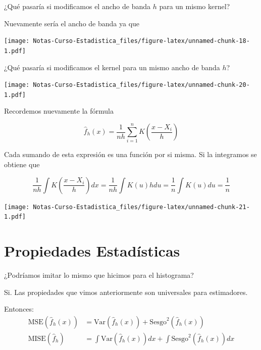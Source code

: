\documentclass[
  12pt,
]{book}
\theoremstyle{definition}
\theoremstyle{definition}
\theoremstyle{definition}
\theoremstyle{remark}
\let\BeginKnitrBlock\begin \let\EndKnitrBlock\end
\begin{document}
\BeginKnitrBlock{remark}
{}¿Qué pasaría si modificamos el ancho de banda \(h\) para un mismo kernel?
\EndKnitrBlock{remark}

Nuevamente sería el ancho de banda ya que

\texttt{[image: Notas-Curso-Estadistica\_files/figure-latex/unnamed-chunk-18-1.pdf]}

\BeginKnitrBlock{remark}
{}¿Qué pasaría si modificamos el kernel para un mismo ancho de banda \(h\)?
\EndKnitrBlock{remark}

\texttt{[image: Notas-Curso-Estadistica\_files/figure-latex/unnamed-chunk-20-1.pdf]}

Recordemos nuevamente la fórmula

\begin{equation*}
\hat{f}_{h}\left( x \right) = \frac{1}{nh}\sum_{i=1}^{n} K\left( \frac{x-X_{i}}{h} \right)
\end{equation*}

Cada sumando de esta expresión es una función por si misma. Si la integramos se obtiene que

\begin{equation*}
\frac{1}{nh}\int K\left( \frac{x-X_{i}}{h} \right) dx
= \frac{1}{nh} \int K\left( u \right) h du
= \frac{1}{n} \int K(u) du
= \frac{1}{n}
\end{equation*}

\texttt{[image: Notas-Curso-Estadistica\_files/figure-latex/unnamed-chunk-21-1.pdf]}

\hypertarget{propiedades-estaduxedsticas-1}{%
\section{Propiedades Estadísticas}\label{propiedades-estaduxedsticas-1}}

\BeginKnitrBlock{remark}
{}¿Podríamos imitar lo mismo que hicimos para el histograma?
\EndKnitrBlock{remark}

Si. Las propiedades que vimos anteriormente son universales para estimadores.

Entonces:
\begin{align*}
\mathrm{MSE}(\hat{f}_{h}(x)) & =\mathrm{Var}(\hat{f}_{h}(x))+\mathrm{Sesgo}^{2} (\hat{f}_{h}(x))            \\
\mathrm{MISE}(\hat{f}_{h})   & =\int\mathrm{Var}(\hat{f}_{h}(x))dx+\int\mathrm{Sesgo}^{2}(\hat{f}_{h}(x))dx
\end{align*}
\end{document}
